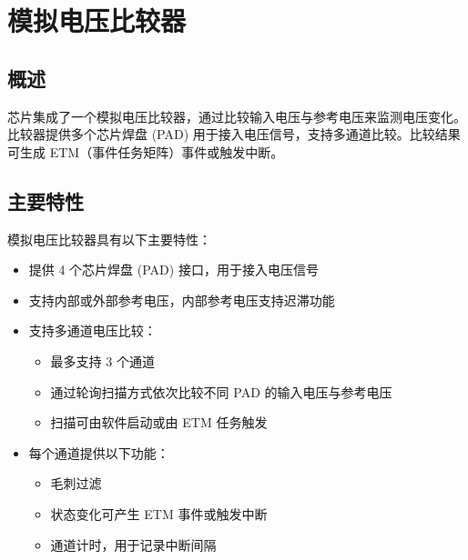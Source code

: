 \documentclass[main\_\_CN.tex]{subfiles}
\begin{document}
\setchineseformatting


\ifglobal
\else
    \clearpage
    \listoftodos
    \listofdonetodos
    \tableofcontents
\fi



\hypertarget{anacom}{}
\chapter{模拟电压比较器}
\label{mod:anacom}



\section{概述}


\chipname{} 芯片集成了一个模拟电压比较器，通过比较输入电压与参考电压来监测电压变化。比较器提供多个芯片焊盘 (PAD) 用于接入电压信号，支持多通道比较。比较结果可生成 ETM（事件任务矩阵）事件或触发中断。



\section{主要特性}
\label{sec:anacom-features}

模拟电压比较器具有以下主要特性：

\begin{itemize}
    \item 提供 4 个芯片焊盘 (PAD) 接口，用于接入电压信号
    \item 支持内部或外部参考电压，内部参考电压支持迟滞功能
    \item 支持多通道电压比较：
    \begin{itemize}
        \item 最多支持 3 个通道
        \item 通过轮询扫描方式依次比较不同 PAD 的输入电压与参考电压
        \item 扫描可由软件启动或由 ETM 任务触发
    \end{itemize}
    \item 每个通道提供以下功能：
    \begin{itemize}
        \item 毛刺过滤
        \item 状态变化可产生 ETM 事件或触发中断
        \item 通道计时，用于记录中断间隔
    \end{itemize}
\end{itemize}
\end{document}
